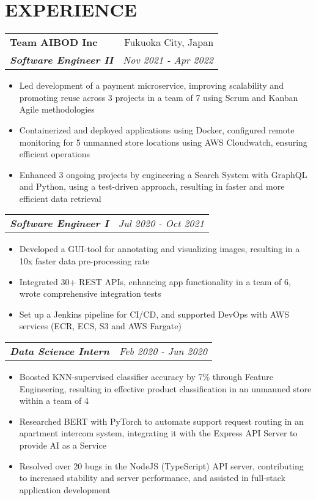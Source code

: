 \documentclass[letterpaper]{article}
\makeatletter
\newcommand{\resumeItemWithoutTitle}[1]{
  \item{
    {#1 \vspace{-4pt}}
  }
}
\newcommand{\resumeSubheadingWithoutTitle}[2]{
  \begin{tabular*}{\textwidth}{l@{\extracolsep{\fill}}r}
        \textbf{\textit{#1}} & \textit{ #2} \\
    \end{tabular*}\vspace{-15pt}
}
\newcommand{\resumeSubheading}[4]{
    \begin{tabular*}{\textwidth}{l@{\extracolsep{\fill}}r}
        \textbf{#1} & #2 \\
        \textbf{\textit{#3}} & \textit{ #4} \\
    \end{tabular*}\vspace{-10pt}
}
\newcommand{\shortSection}[1]{
    \vspace{-6pt}
    \section{#1}
}
\newcommand{\resumeItemListStart}{\begin{itemize}}
\newcommand{\resumeItemListEnd}{\end{itemize}}
\makeatother
\begin{document}
\shortSection{EXPERIENCE}
\resumeSubheading
{Team AIBOD Inc}{Fukuoka City, Japan}
{Software Engineer II}{Nov 2021 - Apr 2022}
\vspace{2pt}
\resumeItemListStart
\resumeItemWithoutTitle{Led development of a payment microservice, improving scalability and promoting reuse across 3 projects in a team of 7 using Scrum and Kanban Agile methodologies}
\resumeItemWithoutTitle{Containerized and deployed applications using Docker, configured remote monitoring for 5 unmanned store locations using AWS Cloudwatch, ensuring efficient operations}
\resumeItemWithoutTitle{Enhanced 3 ongoing projects by engineering a Search System with GraphQL and Python, using a test-driven approach, resulting in faster and more efficient data retrieval}
\resumeItemListEnd

\vspace{2pt}
\resumeSubheadingWithoutTitle
{Software Engineer I}{Jul 2020 - Oct 2021}
\vspace{0pt}
\resumeItemListStart
\resumeItemWithoutTitle{Developed a GUI-tool for annotating and visualizing images, resulting in a 10x faster data pre-processing rate }
\resumeItemWithoutTitle{Integrated 30+ REST APIs, enhancing app functionality in a team of 6, wrote comprehensive integration tests}
\resumeItemWithoutTitle{Set up a Jenkins pipeline for CI/CD, and supported DevOps with AWS services (ECR, ECS, S3 and AWS Fargate)}
\resumeItemListEnd

\vspace{2pt}
\resumeSubheadingWithoutTitle
{Data Science Intern}{Feb 2020 - Jun 2020}
\vspace{0pt}
\resumeItemListStart
\resumeItemWithoutTitle{Boosted KNN-supervised classifier accuracy by 7\% through Feature Engineering, resulting in effective product classification in an unmanned store within a team of 4}
\resumeItemWithoutTitle{Researched BERT with PyTorch to automate support request routing in an apartment intercom system, integrating it with the Express API Server to provide AI as a Service}
\resumeItemWithoutTitle{Resolved over 20 bugs in the NodeJS (TypeScript) API server, contributing to increased stability and server performance, and assisted in full-stack application development}
\resumeItemListEnd
\end{document}
